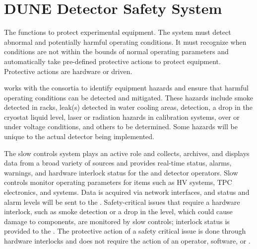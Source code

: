\section{DUNE Detector Safety System}
\label{sec:fdsp-coord-det-safety}


The  functions to protect experimental equipment.  The
system must detect abnormal and potentially harmful operating
conditions.  It must recognize when conditions are not within the
bounds of normal operating parameters and automatically take
pre-defined protective actions to protect equipment. Protective
actions are hardware or  driven.

  works with the consortia to identify equipment
hazards and ensure that harmful operating conditions can be detected
and mitigated.  These hazards include smoke detected in racks, leak(s)
detected in water cooling areas,  detection, a drop in the
cryostat  liquid level, laser or radiation hazards in
calibration systems, over or under voltage conditions, and others to
be determined.  Some hazards will be unique to the actual detector
being implemented.

The slow controls system plays an active role and collects, archives,
and displays data from a broad variety of sources and provides
real-time status, alarms, warnings, and hardware interlock status for
the  and detector operators. Slow controls %
monitor operating parameters for items such as HV systems, TPC electronics,
and  systems. Data is acquired via network interfaces, and status and
alarm levels will be sent to the .  Safety-critical issues that
require a hardware interlock, such as smoke detection or a drop in the
 level, which could cause  damage to components, are monitored by
slow controls; interlock status is provided to the .  The
protective action of a safety critical issue is done through hardware
interlocks and does not require the action of an operator, software, or
.

